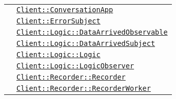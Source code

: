 \begin{longtable}{|>{\centering}m{3cm}|m{10cm}<{\centering}|}
& \hyperref[Client::ConversationApp]{\texttt{Client::ConversationApp}}\\
& \hyperref[Client::ErrorSubject]{\texttt{Client::ErrorSubject}}\\
& \hyperref[Client::Logic::DataArrivedObservable]{\texttt{Client::Logic::DataArrivedObservable}}\\
& \hyperref[Client::Logic::DataArrivedSubject]{\texttt{Client::Logic::DataArrivedSubject}}\\
& \hyperref[Client::Logic::Logic]{\texttt{Client::Logic::Logic}}\\
& \hyperref[Client::Logic::LogicObserver]{\texttt{Client::Logic::LogicObserver}}\\
& \hyperref[Client::Recorder::Recorder]{\texttt{Client::Recorder::Recorder}}\\
& \hyperref[Client::Recorder::RecorderWorker]{\texttt{Client::Recorder::RecorderWorker}}\\ \hline


\end{longtable}
